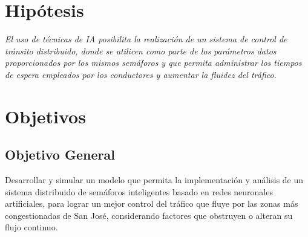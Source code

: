 \section{Hip\'{o}tesis}

\textit{El uso de t\'{e}cnicas de IA posibilita la realizaci\'{o}n de un sistema
de control de tr\'{a}nsito distribuido, donde se utilicen como parte de los par\'{a}metros datos
proporcionados por los mismos sem\'{a}foros y que permita administrar los tiempos de
espera empleados por los conductores y aumentar la fluidez del tr\'{a}fico.}

\section{Objetivos}
	\subsection{Objetivo General}
	
		Desarrollar y simular un modelo que permita la implementaci\'{o}n y an\'{a}lisis de un
	sistema distribuido de sem\'{a}foros inteligentes basado en redes neuronales
	artificiales, para lograr un mejor control del tr\'{a}fico que fluye
	por las zonas m\'{a}s congestionadas de San Jos\'{e}, considerando
	factores que obstruyen o alteran su flujo continuo.
	
